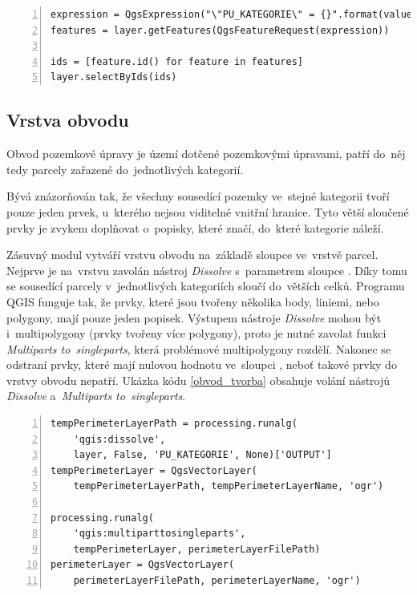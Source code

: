 {\scriptsize
\begin{lstlisting}[style=python, caption={Kategorie parcel~– výběr prvků v~kategorii}, captionpos=b, label=vyber_v_kategorii, backgroundcolor = \color{light-gray},  numbers=left]
expression = QgsExpression("\"PU_KATEGORIE\" = {}".format(value))
features = layer.getFeatures(QgsFeatureRequest(expression))

ids = [feature.id() for feature in features]
layer.selectByIds(ids)
\end{lstlisting}}

\subsection{Vrstva obvodu}
\label{vrstva_obvodu}

Obvod pozemkové úpravy je území dotčené pozemkovými úpravami, patří do~něj tedy parcely zařazené do~jednotlivých kategorií.

Bývá znázorňován tak, že všechny sousedící pozemky ve~stejné kategorii tvoří pouze jeden prvek, u~kterého nejsou viditelné vnitřní hranice. Tyto větší sloučené prvky je zvykem doplňovat o~popisky, které značí, do~které kategorie náleží.

Zásuvný modul vytváří vrstvu obvodu na~základě sloupce \texttt{} ve~vrstvě parcel. Nejprve je na~vrstvu \texttt{} zavolán nástroj \textit{Dissolve} s~parametrem sloupce \texttt{}. Díky tomu se sousedící parcely v~jednotlivých kategoriích sloučí do~větších celků. Programu QGIS funguje tak, že prvky, které jsou tvořeny několika body, liniemi, nebo polygony, mají pouze jeden popisek. Výstupem nástroje \textit{Dissolve} mohou být i~multipolygony (prvky tvořeny více polygony), proto je nutné zavolat funkci \textit{Multiparts to~singleparts}, která problémové multipolygony rozdělí. Nakonec se odstraní prvky, které mají nulovou hodnotu ve~sloupci \texttt{}, neboť takové prvky do vrstvy obvodu nepatří. Ukázka kódu \ref{obvod_tvorba} obsahuje volání nástrojů \textit{Dissolve} a~\textit{Multiparts to~singleparts}.

{\scriptsize
\begin{lstlisting}[style=python, caption={Vrstva obvodu~– tvorba}, captionpos=b, label=obvod_tvorba, backgroundcolor = \color{light-gray},  numbers=left]
tempPerimeterLayerPath = processing.runalg(
    'qgis:dissolve',
    layer, False, 'PU_KATEGORIE', None)['OUTPUT']
tempPerimeterLayer = QgsVectorLayer(
    tempPerimeterLayerPath, tempPerimeterLayerName, 'ogr')

processing.runalg(
    'qgis:multiparttosingleparts',
    tempPerimeterLayer, perimeterLayerFilePath)
perimeterLayer = QgsVectorLayer(
    perimeterLayerFilePath, perimeterLayerName, 'ogr')
\end{lstlisting}}

